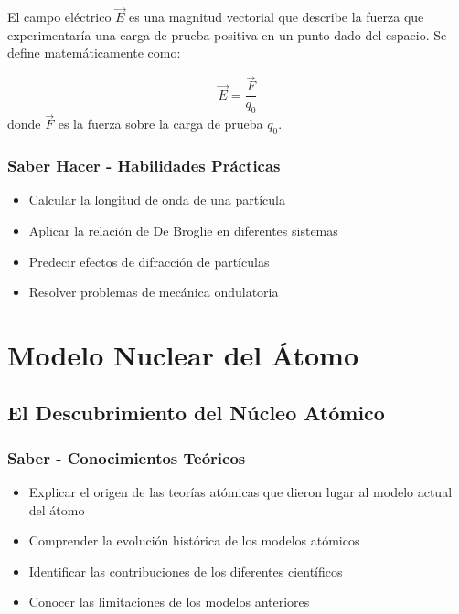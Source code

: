 \documentclass[12pt,a4paper,twoside]{book}
\begin{document}
	El campo eléctrico $\vec{E}$ es una magnitud vectorial que describe la fuerza que experimentaría una carga de prueba positiva en un punto dado del espacio. Se define matemáticamente como:
	
	\begin{ecuacionbox}
		$$\vec{E} = \frac{\vec{F}}{q_0}$$
		donde $\vec{F}$ es la fuerza sobre la carga de prueba $q_0$.
	\end{ecuacionbox}
	
	\subsection{Saber Hacer - Habilidades Prácticas}
	\begin{hacerbox}
		\begin{itemize}
			\item Calcular la longitud de onda de una partícula
			\item Aplicar la relación de De Broglie en diferentes sistemas
			\item Predecir efectos de difracción de partículas
			\item Resolver problemas de mecánica ondulatoria
		\end{itemize}
	\end{hacerbox}
	\chapter{Modelo Nuclear del Átomo}
	\label{chap:modelo_nuclear}
	
	\section{El Descubrimiento del Núcleo Atómico}
	\label{sec:descubrimiento_nucleo}
	
	\subsection{Saber - Conocimientos Teóricos}
	\begin{saberbox}
		\begin{itemize}
			\item Explicar el origen de las teorías atómicas que dieron lugar al modelo actual del átomo
			\item Comprender la evolución histórica de los modelos atómicos
			\item Identificar las contribuciones de los diferentes científicos
			\item Conocer las limitaciones de los modelos anteriores
		\end{itemize}
	\end{saberbox}
	
\end{document}

